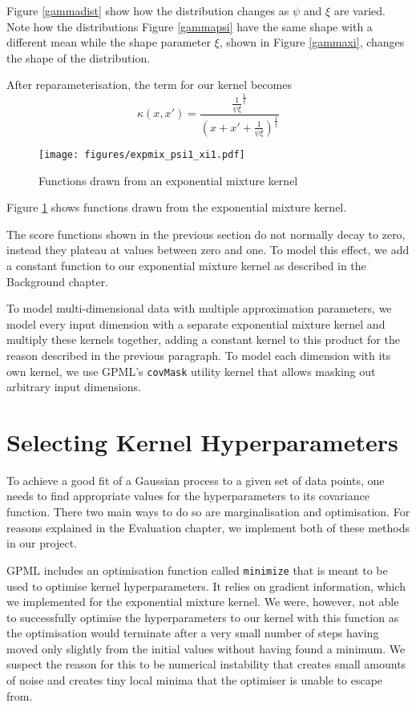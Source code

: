 \documentclass[a4paper,12pt,twoside,openright]{report}
\begin{document}
Figure \ref{gammadist} show how the distribution changes as $\psi$ and $\xi$ are varied. Note how the distributions Figure \ref{gammapsi} have the same shape with a different mean while the shape parameter $\xi$, shown in Figure \ref{gammaxi}, changes the shape of the distribution.

After reparameterisation, the term for our kernel becomes
\begin{equation}
\kappa(x, x') = \frac{\frac{1}{\psi\xi}^{\frac{1}{\xi}}}{(x+x'+\frac{1}{\psi\xi})^{\frac{1}{\xi}}}
\end{equation}

\begin{figure}
\centering

  \centering
  \texttt{[image: figures/expmix\_psi1\_xi1.pdf]}
  \caption{Functions drawn from an exponential mixture kernel}
  \label{expmix11}
\end{figure}

Figure \ref{expmix11} shows functions drawn from the exponential mixture kernel. %

The score functions shown in the previous section do not normally decay to zero, instead they plateau at values between zero and one. To model this effect, we add a constant function to our exponential mixture kernel as described in the Background chapter.

To model multi-dimensional data with multiple approximation parameters, we model every input dimension with a separate exponential mixture kernel and multiply these kernels together, adding a constant kernel to this product for the reason described in the previous paragraph. To model each dimension with its own kernel, we use GPML's \texttt{covMask} utility kernel that allows masking out arbitrary input dimensions.

\section{Selecting Kernel Hyperparameters} 


To achieve a good fit of a Gaussian process to a given set of data points, one needs to find appropriate values for the hyperparameters to its covariance function. There two main ways to do so are marginalisation and optimisation. For reasons explained in the Evaluation chapter, we implement both of these methods in our project.

GPML includes an optimisation function called \texttt{minimize} that is meant to be used to optimise kernel hyperparameters. It relies on gradient information, which we implemented for the exponential mixture kernel. We were, however, not able to successfully optimise the hyperparameters to our kernel with this function as the optimisation would terminate after a very small number of steps having moved only slightly from the initial values without having found a minimum. We suspect the reason for this to be numerical instability that creates small amounts of noise and creates tiny local minima that the optimiser is unable to escape from. 
\end{document}
